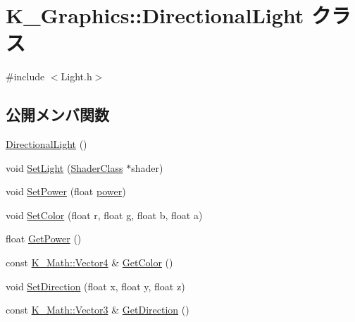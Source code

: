 \hypertarget{class_k___graphics_1_1_directional_light}{}\section{K\+\_\+\+Graphics\+:\+:Directional\+Light クラス}
\label{class_k___graphics_1_1_directional_light}


{\ttfamily \#include $<$Light.\+h$>$}

\subsection*{公開メンバ関数}
\begin{DoxyCompactItemize}
\item 
\mbox{\hyperlink{class_k___graphics_1_1_directional_light_a59cd654e88bff0875908bf87bb5e0f05}{Directional\+Light}} ()
\item 
void \mbox{\hyperlink{class_k___graphics_1_1_directional_light_a402ab2c96733b3213ee79ee43b8b421b}{Set\+Light}} (\mbox{\hyperlink{class_k___graphics_1_1_shader_class}{Shader\+Class}} $\ast$shader)
\item 
void \mbox{\hyperlink{class_k___graphics_1_1_directional_light_a69bbb0459bf12919943c80eb3d3ba69f}{Set\+Power}} (float \mbox{\hyperlink{class_k___graphics_1_1_directional_light_a537dfbbe17c8c6cf0e827a74aa3d62c9}{power}})
\item 
void \mbox{\hyperlink{class_k___graphics_1_1_directional_light_a4fde47662dc631b7ae403272df4b8b41}{Set\+Color}} (float r, float g, float b, float a)
\item 
float \mbox{\hyperlink{class_k___graphics_1_1_directional_light_a787382b67a5603227533c674b68e2636}{Get\+Power}} ()
\item 
const \mbox{\hyperlink{namespace_k___math_a8d82de9de17eae460600de1e40e8a01f}{K\+\_\+\+Math\+::\+Vector4}} \& \mbox{\hyperlink{class_k___graphics_1_1_directional_light_a091844225b764f4a59038b6f39f1f56e}{Get\+Color}} ()
\item 
void \mbox{\hyperlink{class_k___graphics_1_1_directional_light_a6efbacdc754be4209e5ddeb50fd7c3be}{Set\+Direction}} (float x, float y, float z)
\item 
const \mbox{\hyperlink{namespace_k___math_a66884d78082c39ada4091c211f3570f8}{K\+\_\+\+Math\+::\+Vector3}} \& \mbox{\hyperlink{class_k___graphics_1_1_directional_light_a6f421195d534f3f5e6c62eb64bf5605f}{Get\+Direction}} ()
\end{DoxyCompactItemize}
